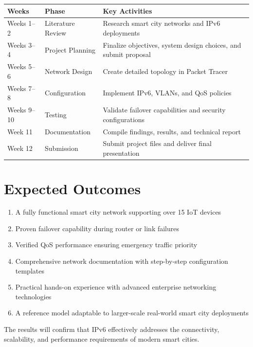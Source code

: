 \documentclass[12pt,a4paper]{article}
\begin{document}
\begin{center}
\begin{tabularx}{\textwidth}{
    |>{\raggedright\arraybackslash}p{2.4cm}
    |>{\raggedright\arraybackslash}p{4.2cm}
    |>{\raggedright\arraybackslash}X|
}
\hline
\textbf{Weeks} & \textbf{Phase} & \textbf{Key Activities} \\
\hline
Weeks 1--2 & Literature Review & Research smart city networks and IPv6 deployments \\
\hline
Weeks 3--4 & Project Planning & Finalize objectives, system design choices, and submit proposal \\
\hline
Weeks 5--6 & Network Design & Create detailed topology in Packet Tracer \\
\hline
Weeks 7--8 & Configuration & Implement IPv6, VLANs, and QoS policies \\
\hline
Weeks 9--10 & Testing & Validate failover capabilities and security configurations \\
\hline
Week 11 & Documentation & Compile findings, results, and technical report \\
\hline
Week 12 & Submission & Submit project files and deliver final presentation \\
\hline
\end{tabularx}
\end{center}

\section*{Expected Outcomes}
{}
\begin{enumerate}[label=7.\arabic*, nosep]
    \item A fully functional smart city network supporting over 15 IoT devices
    \item Proven failover capability during router or link failures
    \item Verified QoS performance ensuring emergency traffic priority
    \item Comprehensive network documentation with step-by-step configuration templates
    \item Practical hands-on experience with advanced enterprise networking technologies
    \item A reference model adaptable to larger-scale real-world smart city deployments
\end{enumerate}

The results will confirm that IPv6 effectively addresses the connectivity, scalability, and performance requirements of modern smart cities.
\end{document}
